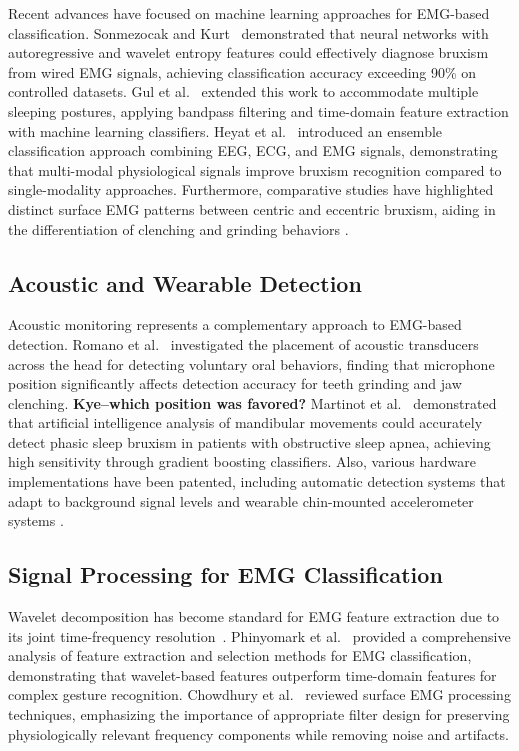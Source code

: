 \documentclass[acmtog, nonacm]{acmart}
\begin{document}
Recent advances have focused on machine learning approaches for EMG-based classification. Sonmezocak and Kurt~\cite{sonmezocak2021detection} demonstrated that neural networks with autoregressive and wavelet entropy features could effectively diagnose bruxism from wired EMG signals, achieving classification accuracy exceeding 90\% on controlled datasets. Gul et al.~\cite{gul2024advanced} extended this work to accommodate multiple sleeping postures, applying bandpass filtering and time-domain feature extraction with machine learning classifiers. Heyat et al.~\cite{heyat2020computational} introduced an ensemble classification approach combining EEG, ECG, and EMG signals, demonstrating that multi-modal physiological signals improve bruxism recognition compared to single-modality approaches. Furthermore, comparative studies have highlighted distinct surface EMG patterns between centric and eccentric bruxism, aiding in the differentiation of clenching and grinding behaviors \cite{lan2022comparative}.

\subsection{Acoustic and Wearable Detection}

Acoustic monitoring represents a complementary approach to EMG-based detection. Romano et al.~\cite{romano2024wearable} investigated the placement of acoustic transducers across the head for detecting voluntary oral behaviors, finding that microphone position significantly affects detection accuracy for teeth grinding and jaw clenching. \textbf{Kye--which position was favored?} Martinot et al.~\cite{martinot2021artificial} demonstrated that artificial intelligence analysis of mandibular movements could accurately detect phasic sleep bruxism in patients with obstructive sleep apnea, achieving high sensitivity through gradient boosting classifiers. Also, various hardware implementations have been patented, including automatic detection systems that adapt to background signal levels \cite{haugland2020automatic} and wearable chin-mounted accelerometer systems \cite{patwa2017bruxism}.

\subsection{Signal Processing for EMG Classification}

Wavelet decomposition has become standard for EMG feature extraction due to its joint time-frequency resolution~\cite{englehart2003robust}. Phinyomark et al.~\cite{phinyomark2012feature} provided a comprehensive analysis of feature extraction and selection methods for EMG classification, demonstrating that wavelet-based features outperform time-domain features for complex gesture recognition. Chowdhury et al.~\cite{chowdhury2013surface} reviewed surface EMG processing techniques, emphasizing the importance of appropriate filter design for preserving physiologically relevant frequency components while removing noise and artifacts.
\end{document}

